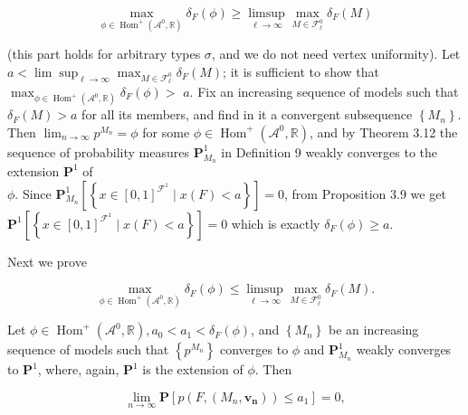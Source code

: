 \documentclass[10pt]{article}
\begin{document}
$$
\max _{\phi \in \operatorname{Hom}^{+}\left(\mathcal{A}^{0}, \mathbb{R}\right)} \delta_{F}(\phi) \geq \limsup _{\ell \rightarrow \infty} \max _{M \in \mathcal{F}_{\ell}^{0}} \delta_{F}(M)
$$

(this part holds for arbitrary types $\sigma$, and we do not need vertex uniformity). Let $a<\lim \sup _{\ell \rightarrow \infty} \max _{M \in \mathcal{F}_{\ell}^{0}} \delta_{F}(M)$; it is sufficient to show that $\max _{\phi \in \operatorname{Hom}^{+}\left(\mathcal{A}^{0}, \mathbb{R}\right)} \delta_{F}(\phi)>$ $a$. Fix an increasing sequence of models such that $\delta_{F}(M)>a$ for all its members, and find in it a convergent subsequence $\left\{M_{n}\right\}$. Then $\lim _{n \rightarrow \infty} p^{M_{n}}=\phi$ for some $\phi \in \operatorname{Hom}^{+}\left(\mathcal{A}^{0}, \mathbb{R}\right)$, and by Theorem 3.12 the sequence of probability measures $\mathbf{P}_{M_{n}}^{1}$ in Definition 9 weakly converges to the extension $\mathbf{P}^{1}$ of\\
$\phi$. Since $\mathbf{P}_{M_{n}}^{1}\left[\left\{x \in[0,1]^{\mathcal{F}^{1}} \mid x(F)<a\right\}\right]=0$, from Proposition 3.9 we get $\mathbf{P}^{1}\left[\left\{x \in[0,1]^{\mathcal{F}^{1}} \mid x(F)<a\right\}\right]=0$ which is exactly $\delta_{F}(\phi) \geq a$.

Next we prove

$$
\max _{\phi \in \operatorname{Hom}^{+}\left(\mathcal{A}^{0}, \mathbb{R}\right)} \delta_{F}(\phi) \leq \limsup _{\ell \rightarrow \infty} \max _{M \in \mathcal{F}_{\ell}^{0}} \delta_{F}(M) .
$$

Let $\phi \in \operatorname{Hom}^{+}\left(\mathcal{A}^{0}, \mathbb{R}\right), a_{0}<a_{1}<\delta_{F}(\phi)$, and $\left\{M_{n}\right\}$ be an increasing sequence of models such that $\left\{p^{M_{n}}\right\}$ converges to $\phi$ and $\mathbf{P}_{M_{n}}^{1}$ weakly converges to $\mathbf{P}^{1}$, where, again, $\mathbf{P}^{1}$ is the extension of $\phi$. Then

$$
\lim _{n \rightarrow \infty} \mathbf{P}\left[p\left(F,\left(M_{n}, \boldsymbol{v}_{\boldsymbol{n}}\right)\right) \leq a_{1}\right]=0,
$$
\end{document}
